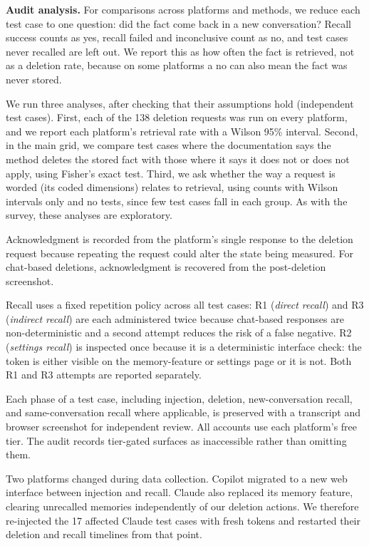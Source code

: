 \documentclass[conference,compsoc]{IEEEtran}
\begin{document}
\textbf{Audit analysis.} For comparisons across platforms and methods, we reduce each test case to one question: did the fact come back in a new conversation? Recall success counts as yes, recall failed and inconclusive count as no, and test cases never recalled are left out. We report this as how often the fact is retrieved, not as a deletion rate, because on some platforms a no can also mean the fact was never stored.

We run three analyses, after checking that their assumptions hold (independent test cases). First, each of the 138 deletion requests was run on every platform, and we report each platform's retrieval rate with a Wilson 95\% interval. Second, in the main grid, we compare test cases where the documentation says the method deletes the stored fact with those where it says it does not or does not apply, using Fisher's exact test. Third, we ask whether the way a request is worded (its coded dimensions) relates to retrieval, using counts with Wilson intervals only and no tests, since few test cases fall in each group. As with the survey, these analyses are exploratory.




Acknowledgment is recorded from the platform's single response to the deletion request because repeating the request could alter the state being measured. For chat-based deletions, acknowledgment is recovered from the post-deletion screenshot.

Recall uses a fixed repetition policy across all test cases: R1 (\textit{direct recall}) and R3 (\textit{indirect recall}) are each administered twice because chat-based responses are non-deterministic and a second attempt reduces the risk of a false negative. R2 (\textit{settings recall}) is inspected once because it is a deterministic interface check: the token is either visible on the memory-feature or settings page or it is not. Both R1 and R3 attempts are reported separately.

Each phase of a test case, including injection, deletion, new-conversation recall, and same-conversation recall where applicable, is preserved with a transcript and browser screenshot for independent review. All accounts use each platform's free tier. The audit records tier-gated surfaces as inaccessible rather than omitting them.


Two platforms changed during data collection. Copilot migrated to a new web interface between injection and recall. Claude also replaced its memory feature, clearing unrecalled memories independently of our deletion actions. We therefore re-injected the 17 affected Claude test cases with fresh tokens and restarted their deletion and recall timelines from that point.
\end{document}
